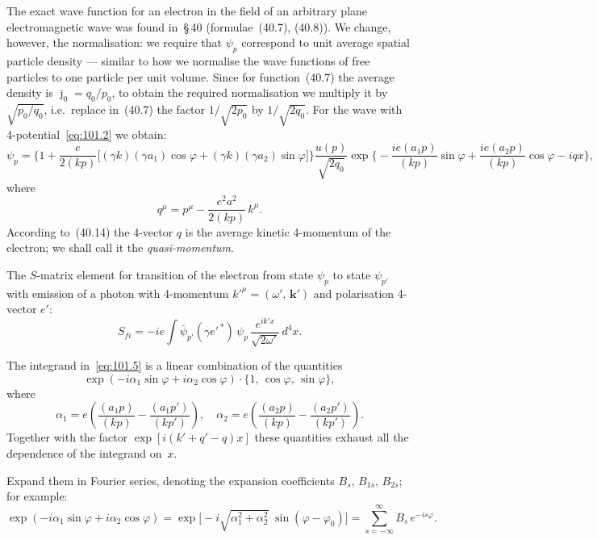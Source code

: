 The exact wave function for an electron in the field of an arbitrary plane electromagnetic wave was found in~\S\,40 (formulae~(40.7), (40.8)). We change, however, the normalisation: we require that $\psi_p$ correspond to unit average spatial particle density --- similar to how we normalise the wave functions of free particles to one particle per unit volume. Since for function~(40.7) the average density is $\bar{\jmath}_0 = q_0/p_0$, to obtain the required normalisation we multiply it by $\sqrt{p_0/q_0}$, i.e.\ replace in~(40.7) the factor $1/\sqrt{2p_0}$ by $1/\sqrt{2q_0}$. For the wave with 4-potential~\eqref{eq:101.2} we obtain:
\begin{equation}
\psi_p = \biggl\{1 + \frac{e}{2(kp)}\bigl[(\gamma k)(\gamma a_1)\cos\varphi + (\gamma k)(\gamma a_2)\sin\varphi\bigr]\biggr\} \frac{u(p)}{\sqrt{2q_0}} \exp\biggl\{-\frac{ie(a_1 p)}{(kp)}\sin\varphi + \frac{ie(a_2 p)}{(kp)}\cos\varphi - iqx\biggr\},
\label{eq:101.3}
\end{equation}
where
\begin{equation}
q^\mu = p^\mu - \frac{e^2 a^2}{2(kp)}\,k^\mu.
\label{eq:101.4}
\end{equation}
According to~(40.14) the 4-vector $q$ is the average kinetic 4-momentum of the electron; we shall call it the \emph{quasi-momentum}.

The $S$-matrix element for transition of the electron from state $\psi_p$ to state $\psi_{p'}$ with emission of a photon with 4-momentum $k'^\mu = (\omega',\,\mathbf{k}')$ and polarisation 4-vector $e'$:
\begin{equation}
S_{fi} = -ie \int \bar{\psi}_{p'}(\gamma e'^{\,*})\,\psi_p\,\frac{e^{ik'x}}{\sqrt{2\omega'}}\,d^4x.
\label{eq:101.5}
\end{equation}

The integrand in~\eqref{eq:101.5} is a linear combination of the quantities
\[
\exp(-i\alpha_1\sin\varphi + i\alpha_2\cos\varphi)\cdot\{1,\,\cos\varphi,\,\sin\varphi\},
\]
where
\begin{equation}
\alpha_1 = e\!\left(\frac{(a_1 p)}{(kp)} - \frac{(a_1 p')}{(kp')}\right)\!, \quad \alpha_2 = e\!\left(\frac{(a_2 p)}{(kp)} - \frac{(a_2 p')}{(kp')}\right)\!.
\label{eq:101.6}
\end{equation}
Together with the factor $\exp[i(k' + q' - q)x]$ these quantities exhaust all the dependence of the integrand on~$x$.


Expand them in Fourier series, denoting the expansion coefficients $B_s$, $B_{1s}$, $B_{2s}$; for example:
\[
\exp(-i\alpha_1\sin\varphi + i\alpha_2\cos\varphi) = \exp\bigl[-i\sqrt{\alpha_1^2 + \alpha_2^2}\;\sin(\varphi - \varphi_0)\bigr] = \sum_{s=-\infty}^{\infty} B_s\,e^{-is\varphi}.
\]

